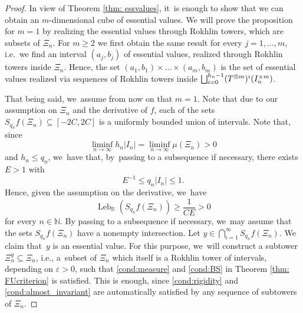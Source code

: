 \documentclass[10pt,a4paper]{article}
\providecommand{\ie}{i.e.\ }
\let\oldbigsqcup\bigsqcup
\renewcommand{\bigsqcup}{\mathop{\textstyle\oldbigsqcup}\displaylimits}
\let\epsilon\varepsilon
\DeclareMathOperator{\Leb}{Leb}
\theoremstyle{plain}
\theoremstyle{definition}
\newcommand{\N}{\mathbb{N}}
\newcommand{\R}{\mathbb{R}}
\begin{document}
\begin{proof}
In view of Theorem \ref{thm: essvalues}, it~is enough to show that we can
obtain an $m$\nobreakdash-dimensional cube of essential values. We will prove the
proposition for $m=1$ by realizing the essential values through Rokhlin
towers, which are subsets of $\Xi_n$. For $m\ge 2$ we first obtain the
same result for every $j=1,\ldots,m$, \ie we find an interval $(a_j,b_j)$
of essential values, realized through Rokhlin towers inside $\Xi_n$. Hence,
the set $(a_1,b_1)\times\ldots\times(a_m,b_m)$ is the set of essential
values realized via sequences of Rokhlin towers inside
$\bigsqcup_{i=0}^{h_n-1}(T^{\otimes m})^i(I_n^{\times m})$.

That being said, we~assume from now on that $m=1$. Note that due to our assumption on $\Xi_n$ and the derivative of $f$, each of the sets $S_{q_n}f(\Xi_n)\subseteq [-2C,2C]$ is a uniformly bounded union of intervals. Note that, since
\[
\liminf_{n\to\infty} h_n |I_n| = \liminf_{n\to\infty}\mu(\Xi_n) > 0
\]
and $h_n\le q_n$, we~have that, by~passing to a subsequence if necessary, there exists $E>1$ with
\[
E^{-1}\le q_n|I_n|\le 1.
\]
Hence, given the assumption on the derivative, we~have
\[
\Leb_{\R}\left(S_{q_n}f(\Xi_n)\right)\ge \frac{1}{CE}>0
\]
for every $n\in\N$.
By passing to a subsequence if necessary, we~may assume that the sets $S_{q_n}f(\Xi_n)$ have a nonempty intersection. Let $y\in \bigcap_{i=1}^{\infty} S_{q_n}f(\Xi_n)$. We claim that~$y$ is an essential value. For this purpose, we~will construct a subtower $\Xi_{n}^{y}\subseteq \Xi_n$, i.e., a~subset of $\Xi_n$ which itself is a Rokhlin tower of intervals, depending on $\epsilon>0$, such that \eqref{cond:measure} and \eqref{cond:BS} in Theorem \ref{thm: FUcriterion} is satisfied. This is enough, since \eqref{cond:rigidity} and \eqref{cond:almost_invariant} are automatically satisfied by any sequence of subtowers of $\Xi_n$.


\end{proof}
\end{document}
